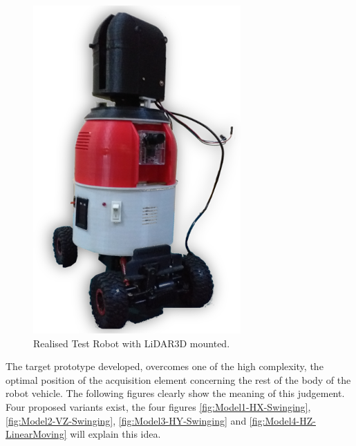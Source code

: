 \documentclass[Afour,sageh,times]{sagej}
\begin{document}
\begin{figure}
    \centering
    \includegraphics[scale=16]{robot3.png}
    \caption{Realised Test Robot with LiDAR3D mounted.}
    \label{fig:RealisedLiDAR3D}
\end{figure}

The target prototype developed, overcomes one of the high complexity, the optimal position of the acquisition element concerning the rest of the body of the robot vehicle. The following figures clearly show the meaning of this judgement. Four proposed variants exist, the four figures  \ref{fig:Model1-HX-Swinging}, \ref{fig:Model2-VZ-Swinging}, \ref{fig:Model3-HY-Swinging} and \ref{fig:Model4-HZ-LinearMoving} will explain this idea.
\end{document}
